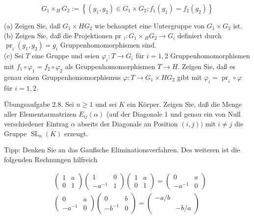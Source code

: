 \documentclass[10pt, letterpaper]{article}
\begin{document}
$$
G_{1} \times_{H} G_{2}:=\left\{\left(g_{1}, g_{2}\right) \in G_{1} \times G_{2} ; f_{1}\left(g_{1}\right)=f_{2}\left(g_{2}\right)\right\}
$$

(a) Zeigen Sie, daß $G_{1} \times H G_{2}$ wie behauptet eine Untergruppe von $G_{1} \times G_{2}$ ist.\\
(b) Zeigen Sie, daß die Projektionen pr ${ }_{i}: G_{1} \times{ }_{H} G_{2} \rightarrow G_{i}$ definiert durch $\operatorname{pr}_{i}\left(g_{1}, g_{2}\right)=g_{i}$ Gruppenhomomorphismen sind.\\
(c) Sei $T$ eine Gruppe und seien $\varphi_{i}: T \rightarrow G_{i}$ für $i=1,2$ Gruppenhomomorphismen mit $f_{1} \circ \varphi_{1}=f_{2} \circ \varphi_{2}$ als Gruppenhomomorphismen $T \rightarrow H$. Zeigen Sie, daß es genau einen Gruppenhomomorphismus $\varphi: T \rightarrow G_{1} \times H G_{2}$ gibt mit $\varphi_{i}=\operatorname{pr}_{i} \circ \varphi$ für $i=1,2$.

Übungsaufgabe 2.8. Sei $n \geq 1$ und sei $K$ ein Körper. Zeigen Sie, daß die Menge aller Elementarmatrizen $E_{i j}(\alpha)$ (auf der Diagonale 1 und genau ein von Null verschiedener Eintrag $\alpha$ abseits der Diagonale an Position $(i, j))$ mit $i \neq j$ die Gruppe $\operatorname{SL}_{n}(K)$ erzeugt.

Tipp: Denken Sie an das Gaußsche Eliminationsverfahren. Des weiteren ist die folgenden Rechnungen hilfreich

$$
\begin{aligned}
& \left(\begin{array}{ll}
1 & a \\
0 & 1
\end{array}\right)\left(\begin{array}{cc}
1 & 0 \\
-a^{-1} & 1
\end{array}\right)\left(\begin{array}{ll}
1 & a \\
0 & 1
\end{array}\right)=\left(\begin{array}{cc}
0 & a \\
-a^{-1} & 0
\end{array}\right) \\
& \left(\begin{array}{cc}
0 & a \\
-a^{-1} & 0
\end{array}\right)\left(\begin{array}{cc}
0 & b \\
-b^{-1} & 0
\end{array}\right)=\left(\begin{array}{cc}
-a / b & \\
& -b / a
\end{array}\right)
\end{aligned}
$$
\end{document}
